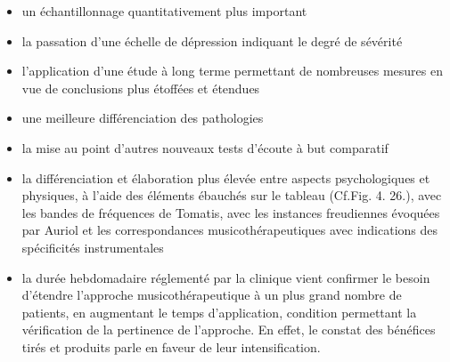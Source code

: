 \begin{itemize}
  
\item un échantillonnage quantitativement plus important
 \item la passation d'une échelle de
     dépression indiquant le degré de sévérité
\item  l'application d'une étude à long terme permettant de nombreuses
  mesures en vue de conclusions plus étoffées et étendues
 
   \item  une meilleure différenciation des pathologies
     \item la mise au point  d'autres nouveaux tests d'écoute à but 
       comparatif
     \item la différenciation et élaboration plus élevée entre aspects 
       psychologiques et physiques, à l'aide des éléments ébauchés sur
       le tableau (Cf.Fig. 4. 26.), avec les bandes de fréquences de
       Tomatis, avec les instances freudiennes évoquées par Auriol et
       les correspondances musicothérapeutiques avec indications des
       spécificités instrumentales
       
     

 
 

  
 
     \item la durée hebdomadaire réglementé par la clinique vient 
       confirmer le besoin d'étendre l'approche musicothérapeutique à
       un plus grand nombre de patients, en augmentant le temps
       d'application, condition permettant la vérification de la
       pertinence de l'approche. En effet, le constat des bénéfices
       tirés et 
       produits parle en faveur de leur intensification.


\end{itemize}
